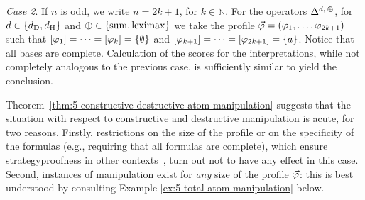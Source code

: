 \begin{prf*}{}{}
	\emph{Case 2}.
	If $n$ is odd, we write $n=2k+1$, for $k\in\mathbb{N}$.
	For the operators $\me^{\dd,\:\agg}$, 
	for $\dd\in\{\dd_{\drastic},\dd_{\hamming}\}$ and $\agg\in\set{\ssum,\leximax}$ 
	we take the profile $\P=(\phi_1,\dots,\phi_{2k+1})$ 
	such that $\mods{\phi_1}=\dots=\mods{\phi_k}=\set{\emptyset}$ and $\mods{\phi_{k+1}}=\dots=\mods{\phi_{2k+1}}=\set{a}$. 
	Notice that all bases are complete.
	Calculation of the scores for the interpretations, while not completely analogous to the previous case,
	is sufficiently similar to yield the conclusion.
\end{prf*}

Theorem~\ref{thm:5-constructive-destructive-atom-manipulation} 
suggests that the situation with respect to constructive and destructive 
manipulation is acute, for two reasons. Firstly, restrictions on the size of 
the profile or on the specificity of the formulas (e.g., requiring that all formulas are complete), 
which ensure strategyproofness in other contexts~\cite{EveraereKM07},
turn out not to have any effect in this case. 
Second, instances of manipulation exist for \emph{any} size of the profile $\P$: this is
best understood by consulting Example \ref{ex:5-total-atom-manipulation} below.

\begin{table}\centering
		\caption{
			Constructive $\skept$-manipulation of a profile 
			$\P=(\phi_i)_{1\le i \le 4}$ with respect to the atom $a$,
			relative to the operators $\me^{\hamming,\:\ssum}$
			and $\me^{\hamming,\:\leximax}$.		
		}
		\label{tab:5-total-atom-manipulation}
\end{table}

